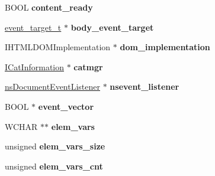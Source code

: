 \begin{DoxyCompactItemize}
\item 
\mbox{\label{struct_h_t_m_l_document_node_adad2745254508bd6ef1f6ae364bb995a}} 
B\+O\+OL {\bfseries content\+\_\+ready}
\item 
\mbox{\label{struct_h_t_m_l_document_node_a4465100ee3ee3ff92623ac27c4cb7a8b}} 
\hyperlink{structevent__target__t}{event\+\_\+target\+\_\+t} $\ast$ {\bfseries body\+\_\+event\+\_\+target}
\item 
\mbox{\label{struct_h_t_m_l_document_node_ab2a9bab36dfa06329314c6a4ac5a01a7}} 
I\+H\+T\+M\+L\+D\+O\+M\+Implementation $\ast$ {\bfseries dom\+\_\+implementation}
\item 
\mbox{\label{struct_h_t_m_l_document_node_a35e6552ed57e3893aa08f053c3f8d32f}} 
\hyperlink{interface_i_cat_information}{I\+Cat\+Information} $\ast$ {\bfseries catmgr}
\item 
\mbox{\label{struct_h_t_m_l_document_node_ab4443b29325730ff8c617b5f91e591ed}} 
\hyperlink{structns_document_event_listener}{ns\+Document\+Event\+Listener} $\ast$ {\bfseries nsevent\+\_\+listener}
\item 
\mbox{\label{struct_h_t_m_l_document_node_afc23a6bc582890a1d15b93f74e75994e}} 
B\+O\+OL $\ast$ {\bfseries event\+\_\+vector}
\item 
\mbox{\label{struct_h_t_m_l_document_node_aa550f446ed6db0bdf7d147e6faf8e7d9}} 
W\+C\+H\+AR $\ast$$\ast$ {\bfseries elem\+\_\+vars}
\item 
\mbox{\label{struct_h_t_m_l_document_node_a7efdee18f1e180d31acf59e2be98e2c9}} 
unsigned {\bfseries elem\+\_\+vars\+\_\+size}
\item 
\mbox{\label{struct_h_t_m_l_document_node_a37e6499e895d8973e38e86a5d92518d8}} 
unsigned {\bfseries elem\+\_\+vars\+\_\+cnt}
\item 
\mbox{\label{struct_h_t_m_l_document_node_a73bab37304db8b00adb84a8c48aceedb}} 
$$
\end{DoxyCompactItemize}

